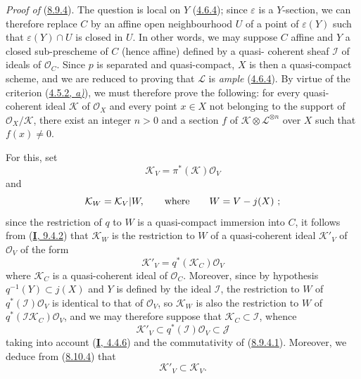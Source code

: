 \begin{env}[8.10.6]
\label{II.8.10.6}
\emph{Proof of} (\hyperref[II.8.9.4]{8.9.4}). The question is
local on $Y$ (\hyperref[II.4.6.4]{4.6.4}); since $\varepsilon$ is a
$Y$-section, we can therefore replace $C$ by an affine open neighbourhood $U$
of a point of $\varepsilon(Y)$ such that $\varepsilon(Y)\cap U$ is closed in
$U$. In other words, we may suppose $C$ affine and $Y$ a closed sub-prescheme
of $C$ (hence affine) defined by a quasi-%
coherent sheaf $\mathcal{I}$ of ideals of $\mathcal{O}_C$. Since $p$ is
separated and quasi-compact, $X$ is then a quasi-compact scheme, and we are
reduced to proving that $\mathcal{L}$ is \emph{ample}
(\hyperref[II.4.6.4]{4.6.4}). By virtue of the criterion
(\hyperref[II.4.5.2]{4.5.2, \emph{a)}}), we must therefore prove the following: for
every quasi-coherent ideal $\mathcal{K}$ of $\mathcal{O}_X$ and every point
$x\in X$ not belonging to the support of $\mathcal{O}_X/\mathcal{K}$, there
exist an integer $n>0$ and a section $f$ of
$\mathcal{K}\otimes\mathcal{L}^{\otimes n}$ over $X$ such that
$f(x)\neq0$.

For this, set
\[
  \mathcal{K}_V=\pi^*(\mathcal{K})\mathcal{O}_V
\]
and
\[
  \mathcal{K}_W=\mathcal{K}_V|W,\qquad\hbox{where}\qquad W=V- j(X)~;
\]
since the restriction of $q$ to $W$ is a quasi-compact immersion into $C$,
it follows from (\hyperref[I.9.4.2]{\textbf{I}, 9.4.2}) that $\mathcal{K}_W$ is the
restriction to $W$ of a quasi-coherent ideal $\mathcal{K}'_V$ of
$\mathcal{O}_V$ of the form
\[
  \mathcal{K}'_V=q^*(\mathcal{K}_C)\mathcal{O}_V
\]
where $\mathcal{K}_C$ is a quasi-coherent ideal of $\mathcal{O}_C$. Moreover,
since by hypothesis $q^{-1}(Y)\subset j(X)$ and $Y$ is defined by the ideal
$\mathcal{I}$, the restriction to $W$ of $q^*(\mathcal{I})\mathcal{O}_V$ is
identical to that of $\mathcal{O}_V$, so $\mathcal{K}_W$ is also the
restriction to $W$ of $q^*(\mathcal{I}\mathcal{K}_C)\mathcal{O}_V$, and we
may therefore suppose that $\mathcal{K}_C\subset\mathcal{I}$, whence
\begin{equation}
\label{II.8.10.6.1}
  \mathcal{K}'_V\subset q^*(\mathcal{I})\mathcal{O}_V\subset\mathcal{J}
\tag{8.10.6.1}
\end{equation}
taking into account (\hyperref[I.4.4.6]{\textbf{I}, 4.4.6}) and the commutativity of
(\hyperref[II.8.9.4.1]{8.9.4.1}). Moreover, we deduce from
(\hyperref[II.8.10.4]{8.10.4}) that
\begin{equation}
\label{II.8.10.6.2}
  \mathcal{K}'_V\subset\mathcal{K}_V.
\tag{8.10.6.2}
\end{equation}


\end{env}
